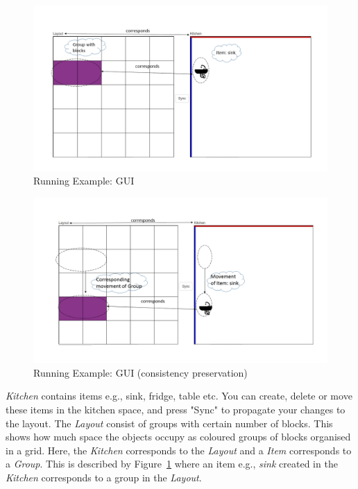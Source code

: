 \begin{figure}
	\includegraphics[width=1\textwidth]{figures/KitchenToGrid}
	\caption{Running Example: GUI}
	\label{fig:Running_Example_GUI}
\end{figure}

\begin{figure}
	\includegraphics[width=1\textwidth]{figures/KitchenToGrid_consistency}
	\caption{Running Example: GUI (consistency preservation)}
	\label{fig:Running_Example_GUI_consistency}
\end{figure}

\textit{Kitchen} contains items e.g., sink, fridge, table etc. You can create, delete or move these items in the kitchen space, and press "Sync" to propagate your changes to the layout. The \textit{Layout} consist of groups with certain number of blocks. This shows how much space the objects occupy as coloured groups of blocks organised in a grid. Here, the \textit{Kitchen} corresponds to the \textit{Layout} and a \textit{Item} corresponds to a \textit{Group}. This is described by Figure~\ref{fig:Running_Example_GUI} where an item e.g., \textit{sink} created in the \textit{Kitchen} corresponds to a group in the \textit{Layout}.

